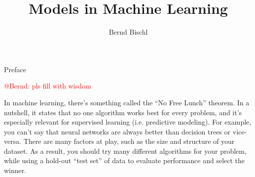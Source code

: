 \documentclass[11pt,compress,t,notes=noshow, xcolor=table]{beamer}
\title{Models in Machine Learning}
\author{Bernd Bischl}
\institute{\href{https://compstat-lmu.github.io/lecture_i2ml/}
{compstat-lmu.github.io/lecture\_i2ml}}
\date{}
\begin{document}









\begin{frame}{Preface}

\textcolor{red}{@Bernd: pls fill with wisdom}

In machine learning, there’s something called the “No Free 
Lunch” theorem. In a nutshell, it states that no one algorithm works best for 
every problem, and it’s especially relevant for supervised learning (i.e. 
predictive modeling).
For example, you can’t say that neural networks are always better than decision 
trees or vice-versa. There are many factors at play, such as the size and 
structure of your dataset.
As a result, you should try many different algorithms for your problem, while 
using a hold-out “test set” of data to evaluate performance and select the 
winner.

\end{frame}

\end{document}
